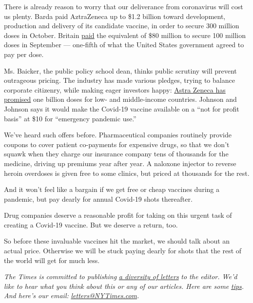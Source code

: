There is already reason to worry that our deliverance from coronavirus
will cost us plenty. Barda paid AztraZeneca up to \$1.2 billion toward
development, production and delivery of its candidate vaccine, in order
to secure 300 million doses in October. Britain
\href{https://www.genengnews.com/news/astrazeneca-wins-1-2b-from-barda-to-develop-manufacture-covid-19-vac}{paid}
the equivalent of \$80 million to secure 100 million doses in September
--- one-fifth of what the United States government agreed to pay per
dose.

Ms. Baicker, the public policy school dean, thinks public scrutiny will
prevent outrageous pricing. The industry has made various pledges,
trying to balance corporate citizenry, while making eager investors
happy:
\href{https://www.astrazeneca.com/media-centre/articles/2020/astrazeneca-takes-next-steps-towards-broad-and-equitable-access-to-oxford-universitys-potential-covid-19-vaccine.html}{Astra
Zeneca has promised} one billion doses for low- and middle-income
countries. Johnson and Johnson says it would make the Covid-19 vaccine
available on a ``not for profit basis'' at \$10 for ``emergency pandemic
use.''

We've heard such offers before. Pharmaceutical companies routinely
provide coupons to cover patient co-payments for expensive drugs, so
that we don't squawk when they charge our insurance company tens of
thousands for the medicine, driving up premiums year after year. A
naloxone injector to reverse heroin overdoses is given free to some
clinics, but priced at thousands for the rest.

And it won't feel like a bargain if we get free or cheap vaccines during
a pandemic, but pay dearly for annual Covid-19 shots thereafter.

Drug companies deserve a reasonable profit for taking on this urgent
task of creating a Covid-19 vaccine. But we deserve a return, too.

So before these invaluable vaccines hit the market, we should talk about
an actual price. Otherwise we will be stuck paying dearly for shots that
the rest of the world will get for much less.

\emph{The Times is committed to publishing}
\href{https://www.nytimes3xbfgragh.onion/2019/01/31/opinion/letters/letters-to-editor-new-york-times-women.html}{\emph{a
diversity of letters}} \emph{to the editor. We'd like to hear what you
think about this or any of our articles. Here are some}
\href{https://help.nytimes3xbfgragh.onion/hc/en-us/articles/115014925288-How-to-submit-a-letter-to-the-editor}{\emph{tips}}\emph{.
And here's our email:}
\href{mailto:letters@NYTimes.com}{\emph{letters@NYTimes.com}}\emph{.}

